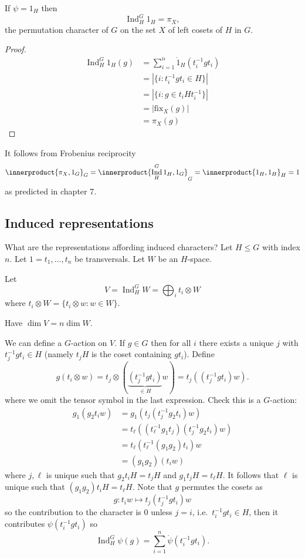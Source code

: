\documentclass[a4paper]{article}
\newcommand*{\ip}{\innerproduct} %
\DeclareMathOperator{\Ind}{Ind} %
\theoremstyle{definition}
\begin{document}
\begin{lemma}
  If \(\psi = 1_H\) then
  \[
    \Ind_H^G 1_H = \pi_X,
  \]
  the permutation character of \(G\) on the set \(X\) of left cosets of \(H\) in \(G\).
\end{lemma}

\begin{proof}
  \begin{align*}
    \Ind_H^G 1_H(g)
    &= \sum_{i = 1}^n \ocirc 1_H(t_i^{-1} g t_i) \\
    &= |\{i: t_i^{-1} g t_i \in H\}| \\
    &= |\{i: g \in t_iHt_i^{-1}\}| \\
    &= |\text{fix}_X(g)| \\
    &= \pi_X (g)
  \end{align*}
\end{proof}

\begin{remark}
  It follows from Frobenius reciprocity
  \[
    \ip{\pi_X, 1_G}_G
    = \ip{\Ind_H^G 1_H, 1_G}_G
    = \ip{1_H, 1_H}_H
    = 1
  \]
  as predicted in chapter 7.
\end{remark}

\subsection{Induced representations}

What are the representations affording induced characters? Let \(H \leq G\) with index \(n\). Let \(1 = t_1, \dots, t_n\) be transversals. Let \(W\) be an \(H\)-space.

\begin{definition}
  Let
  \[
    V = \Ind_H^G W = \bigoplus_i t_i \otimes W
  \]
  where \(t_i \otimes W = \{t_i \otimes w: w \in W\}\).
\end{definition}
Have \(\dim V = n \dim W\).

We can define a \(G\)-action on \(V\). If \(g \in G\) then for all \(i\) there exists a unique \(j\) with \(t_j^{-1} g t_i \in H\) (namely \(t_j H\) is the coset containing \(gt_i\)). Define
\[
  g (t_i \otimes w)
  = t_j \otimes (\underbrace{(t_j^{-1} g t_i)}_{\in H} w)
  =  t_j ((t_j^{-1} g t_i) w).
\]
where we omit the tensor symbol in the last expression. Check this is a \(G\)-action:
\begin{align*}
  g_1(g_2 t_i w)
  &= g_1 (t_j (t_j^{-1} g_2 t_i)w) \\
  &= t_\ell ((t_\ell^{-1} g_1 t_j) (t_j^{-1} g_2 t_i) w) \\
  &= t_\ell (t_\ell^{-1} (g_1g_2)t_i)w \\
  &= (g_1g_2) (t_i w)
\end{align*}
where \(j, \ell\) is unique such that \(g_2 t_i H = t_j H\) and \(g_1 t_jH = t_\ell H\). It follows that \(\ell\) is unique such that \((g_1g_2) t_i H = t_\ell H\). Note that \(g\) permutes the cosets as
\[
  g: t_i w \mapsto t_j(t_j^{-1} g t_i)w
\]
so the contribution to the character is \(0\) unless \(j = i\), i.e.\ \(t_i^{-1}g t_i \in H\), then it contributes \(\psi(t_i^{-1}gt_i)\) so
\[
  \Ind_H^G \psi(g) = \sum_{i = 1}^n \ocirc \psi(t_i^{-1} gt_i).
\]
\end{document}
